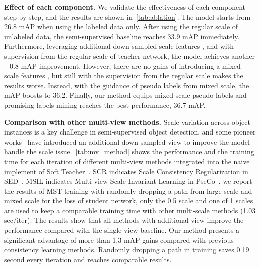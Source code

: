 \documentclass[10pt,twocolumn,letterpaper]{article}
\begin{document}
\vspace{.3em}
\noindent \textbf{Effect of each component.} We validate the effectiveness of each component step by step, and the results are shown in~\cref{tab:ablation}. The model starts from 26.8 mAP when using the labeled data only. After using the regular scale  of unlabeled data, the semi-supervised baseline reaches 33.9 mAP immediately. Furthermore, leveraging additional down-sampled scale features , and with supervision from the regular scale of teacher network, the model achieves another +0.8 mAP improvement. However, there are no gains of introducing a mixed scale features , but still with the supervision from the regular scale makes the results worse. Instead, with the guidance of pseudo labels from mixed scale, the mAP boosts to 36.2. Finally, our method equips mixed scale pseudo labels and promising labels mining reaches the best performance, 36.7 mAP.



\vspace{.3em}
\noindent \textbf{Comparison with other multi-view methods.} Scale variation across object instances is a key challenge in semi-supervised object detection, and some pioneer works~\cite{sed, pseco} have introduced an additional down-sampled view to improve the model handle the scale issue.~\cref{tab:mv_method} shows the performance and the training time for each iteration of different multi-view methods integrated into the naive implement of Soft Teacher~\cite{softTeacher}. SCR indicates Scale Consistency Regularization in SED~\cite{sed}. MSIL indicates Multi-view Scale-Invariant Learning in PseCo~\cite{pseco}. we report the results of MST training with randomly dropping a path from large scale and mixed scale for the loss of student network, \ie only the 0.5 scale and one of 1 scales are used to keep a comparable training time with other multi-scale methods (1.03   sec/iter). The results show that all methods with additional view improve the performance compared with the single view baseline. Our method presents a significant advantage of more than 1.3 mAP gains compared with previous consistency learning methods. Randomly dropping a path in training saves 0.19 second every iteration and reaches comparable results. 
\end{document}
